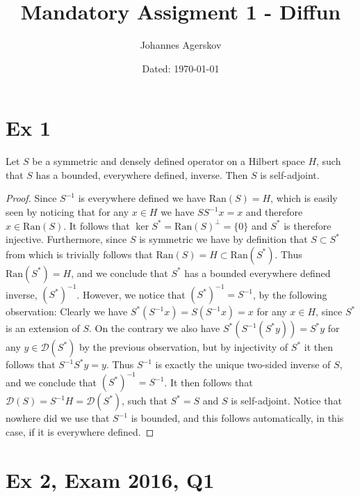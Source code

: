 \documentclass[a4paper,11pt]{article}
\author{Johannes Agerskov}
\date{Dated: \today}
\title{Mandatory Assigment 1 - Diffun}
\newcommand{\Ran}[1]{\text{Ran}\left(#1\right)}
\numberwithin{equation}{section}
\begin{document}
\maketitle	

\section*{Ex 1}
Let $ S $ be a symmetric and densely defined operator on a Hilbert space $ H $, such that $ S $ has a bounded, everywhere defined, inverse. Then $ S $ is self-adjoint.
\begin{proof}
	Since $ S^{-1} $ is everywhere defined we have $ \Ran{S}=H $, which is easily seen by noticing that for any $ x\in H $ we have $ SS^{-1}x=x $ and therefore $ x\in \Ran{S} $. It follows that $ \ker{S^*}=\Ran{S}^\perp=\{0\} $ and $ S^* $ is therefore injective. Furthermore, since $ S $ is symmetric we have by definition that $ S\subset S^* $ from which is trivially follows that $ \Ran{S}=H\subset\Ran{S^*} $. Thus $ \Ran{S^*}=H $, and we conclude that $ S^* $ has a bounded everywhere defined inverse, $ (S^*)^{-1} $. However, we notice that $ (S^*)^{-1}=S^{-1} $, by the following observation: Clearly we have $ S^*(S^{-1}x)=S(S^{-1}x)=x $ for any $ x\in H $, since $ S^* $ is an extension of $ S $. On the contrary we also have $ S^*(S^{-1}(S^*y))=S^*y $ for any $ y\in\mathcal{D}(S^*) $ by the previous observation, but by injectivity of $ S^* $ it then follows that $ S^{-1}S^*y=y $. Thus $ S^{-1} $ is exactly the unique two-sided inverse of $ S $, and we conclude that $ (S^*)^{-1}=S^{-1} $. It then follows that $ \mathcal{D}(S)=S^{-1}H=\mathcal{D}(S^*) $, such that $ S^*=S $ and $ S $ is self-adjoint. Notice that nowhere did we use that $ S^{-1} $ is bounded, and this follows automatically, in this case, if it is everywhere defined.
\end{proof}

\section*{Ex 2, Exam 2016, Q1}
\end{document}

